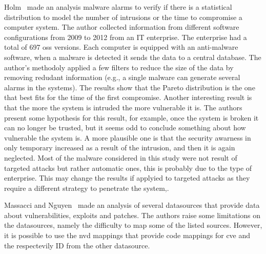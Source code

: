 Holm~\cite{Holm:2014} made an analysis malware alarms to verify if there is a statistical distribution to model the number of intrusions or the time to compromise a computer system.
The author collected information from different software configurations from 2009 to 2012 from an IT enterprise.
The enterprise had a total of 697 \glspl{os} versions.
Each computer is equipped with an anti-malware software, when a malware is detected it sends the data to a central database.
The author's methodoly applied a few filters to reduce the size of the data by removing redudant information (e.g., a single malware can generate several alarms in the systems).
The results show that the Pareto distribution is the one that best fits for the time of the first compromise.
Another interesting result is that the more the system is intruded the more vulnerable it is. 
The authors present some hypothesis for this result, for example, once the system is broken it can no longer be trusted, but it seems odd to conclude something about how vulnerable the system is. 
A more plausible one is that the security awarness in only temporary increased as a result of the intrusion, and then it is again neglected.
Most of the malware considered in this study were not result of targeted attacks but rather automatic ones, this is probably due to the type of enterprise. 
This may change the results if applyied to targeted attacks as they require a different strategy to penetrate the system,.


Massacci and Nguyen~\cite{Massacci:2010} made an analysis of several datasources that provide data about vulnerabilities, exploits and patches. 
The authors raise some limitations on the datasources, namely the difficulty to map some of the listed sources. 
However, it is possible to use the \gls{nvd} mappings that provide code mappings for \gls{cve} and the respectevily ID from the other datasource.



